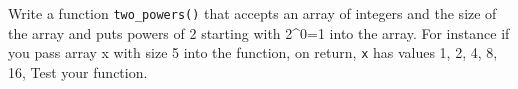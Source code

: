  Write a function \texttt{two\_powers()} that accepts an array of integers and the size of the array and puts powers of 2 starting with 2\^{}0=1 into the array. For instance if you pass array x with size 5 into the function, on return, \texttt{x} has values 1, 2, 4, 8, 16, Test your function.

